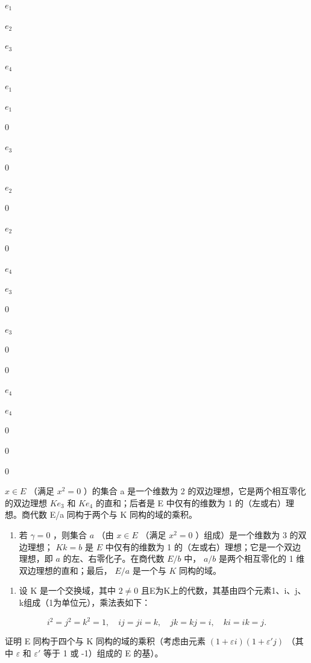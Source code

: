 \(e_1\)

\(e_2\)

\(e_3\)

\(e_4\)

\(e_1\)

\(e_1\)

0

\(e_3\)

0

\(e_2\)

0

\(e_2\)

0

\(e_4\)

\(e_3\)

0

\(e_3\)

0

0

\(e_4\)

\(e_4\)

0

0

0

 \(x \in E\) （满足 \(x^{2} = 0\) ）的集合 a 是一个维数为 2 的双边理想，它是两个相互零化的双边理想 \(Ke_{3}\) 和 \(Ke_{4}\) 的直和；后者是 E 中仅有的维数为 1 的（左或右）理想。商代数 E/a 同构于两个与 K 同构的域的乘积。

\begin{enumerate}
\def\labelenumi{(\alph{enumi})}
\setcounter{enumi}{2}
\tightlist
\item
  若 \(\gamma = 0\) ，则集合 \(a\) （由 \(x \in E\) （满足 \(x^2 = 0\) ）组成）是一个维数为 3 的双边理想； \(Kk = b\) 是 \(E\) 中仅有的维数为 1 的（左或右）理想；它是一个双边理想，即 \(a\) 的左、右零化子。在商代数 \(E/b\) 中， \(a/b\) 是两个相互零化的 1 维双边理想的直和；最后， \(E/a\) 是一个与 \(K\) 同构的域。
\end{enumerate}

\begin{enumerate}
\def\labelenumi{\arabic{enumi}.}
\setcounter{enumi}{6}
\tightlist
\item
  设 K 是一个交换域，其中 \(2 \neq 0\) 且E为K上的代数，其基由四个元素1、i、j、k组成（1为单位元），乘法表如下：
\end{enumerate}

\[
i ^ {2} = j ^ {2} = k ^ {2} = 1, \quad i j = j i = k, \quad j k = k j = i, \quad k i = i k = j.
\]

证明 E 同构于四个与 K 同构的域的乘积（考虑由元素 \((1 + \varepsilon i)(1 + \varepsilon'j)\) （其中 \(\varepsilon\) 和 \(\varepsilon'\) 等于 1 或 -1）组成的 E 的基）。

